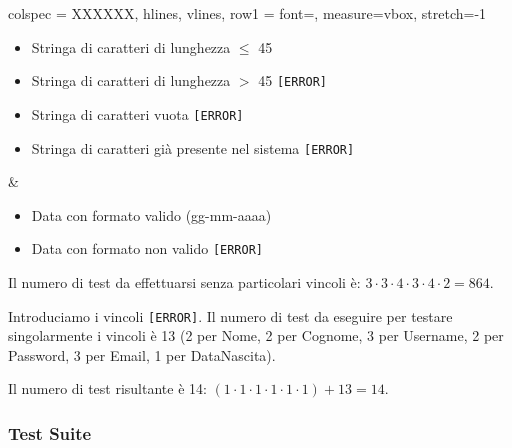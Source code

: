 \begin{table}[!hbp]
\begin{tblr}{
		colspec = XXXXXX,
		hlines, vlines,
		row{1} = {font=\bfseries},
		measure=vbox, stretch=-1
		}
		\begin{itemize}[leftmargin=*]
			\item Stringa di caratteri di lunghezza $\leq$ 45
			\item Stringa di caratteri di lunghezza $>$ 45 \texttt{[ERROR]}
			\item Stringa di caratteri vuota \texttt{[ERROR]}
			\item Stringa di caratteri già presente nel sistema \texttt{[ERROR]}
		\end{itemize} &
		\begin{itemize}[leftmargin=*]
			\item Data con formato valido (gg-mm-aaaa)
			\item Data con formato non valido \texttt{[ERROR]}
		\end{itemize}
	\end{tblr}
\end{table}

\noindent Il numero di test da effettuarsi senza particolari vincoli è: $3 \cdot 3 \cdot 4 \cdot 3 \cdot 4 \cdot 2 = 864$.

\noindent Introduciamo i vincoli \texttt{[ERROR]}. Il numero di test da eseguire per testare singolarmente i vincoli è 13 (2 per Nome, 2 per Cognome, 3 per Username, 2 per Password, 3 per Email, 1 per DataNascita).

\noindent Il numero di test risultante è 14: $(1 \cdot 1 \cdot 1 \cdot 1 \cdot 1 \cdot 1) + 13 = 14$.

\subsubsection*{Test Suite}

